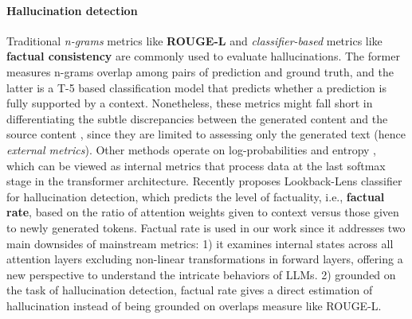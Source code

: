 \paragraph{Hallucination detection}
Traditional \textit{n-grams} metrics like \textbf{ROUGE-L} \cite{lin-2004-rouge} and \textit{classifier-based} metrics like \textbf{factual consistency} \cite{vectara2023} are commonly used to evaluate hallucinations. The former measures n-grams overlap among pairs of prediction and ground truth, and the latter is a T-5 based classification model that predicts whether a prediction is fully supported by a context. Nonetheless, these metrics might fall short in differentiating the subtle discrepancies between the generated content and the source content \cite{huang2023survey}, since they are limited to assessing only the generated text (hence \textit{external metrics}). Other methods operate on log-probabilities \cite{yuan2021bartscore, fu2023gptscore} and entropy \cite{xiao2021hallucination}, which can be viewed as internal metrics that process data at the last softmax stage in the transformer architecture. 
Recently \citet{chuang2024lookback} proposes Lookback-Lens classifier for hallucination detection, which predicts the level of factuality, i.e., \textbf{factual rate}, based on the ratio of attention weights given to context versus those given to newly generated tokens.
Factual rate is used in our work since it addresses two main downsides of mainstream metrics:
1) it examines internal states across all attention layers excluding non-linear transformations in forward layers, offering a new perspective to understand the intricate behaviors of LLMs.
2) grounded on the task of hallucination detection, factual rate gives a direct estimation of hallucination instead of being grounded on overlaps measure like ROUGE-L.


